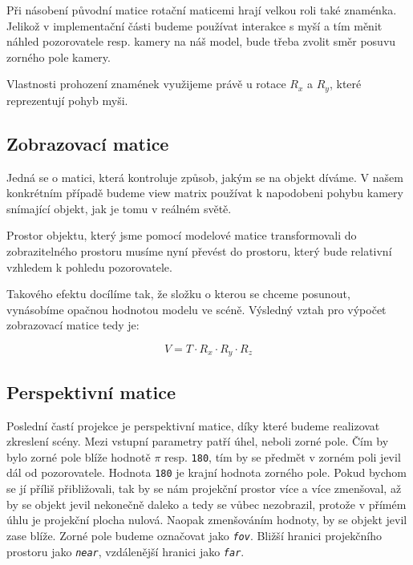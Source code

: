 Při násobení původní matice rotační maticemi hrají  velkou roli také znaménka. Jelikož v implementační části budeme používat interakce s myší a tím měnit náhled pozorovatele resp. kamery na náš model, bude třeba zvolit směr posuvu zorného pole kamery. 

Vlastnosti prohození znamének využijeme právě u  rotace $R_{x}$ a $R_{y}$, které reprezentují pohyb myši.  


\subsection{Zobrazovací matice}
Jedná se o matici, která kontroluje způsob, jakým se na objekt díváme. V našem konkrétním případě budeme view matrix používat k napodobeni pohybu kamery snímající objekt, jak je tomu v reálném světě. 

Prostor objektu, který jsme pomocí modelové matice transformovali do zobrazitelného prostoru musíme nyní převést do prostoru, který bude relativní vzhledem k pohledu pozorovatele.

Takového efektu docílíme tak, že složku o kterou se chceme posunout, vynásobíme opačnou hodnotou modelu ve scéně. Výsledný vztah pro výpočet zobrazovací matice tedy je:

$$ V = T \cdot R_{x} \cdot R_{y} \cdot R_{z} $$ 

\newpage


\subsection{Perspektivní matice}
Poslední častí projekce je perspektivní matice, díky které budeme realizovat zkreslení scény. Mezi vstupní parametry patří úhel, neboli zorné pole. Čím by bylo zorné pole blíže hodnotě $\pi$ resp. \texttt{180\degree}, tím by se předmět v zorném poli jevil dál od pozorovatele. Hodnota \texttt{180\degree} je krajní hodnota zorného pole. Pokud bychom se jí příliš přibližovali, tak by se nám projekční prostor více a více zmenšoval, až by se objekt jevil nekonečně daleko a tedy se vůbec nezobrazil, protože v přímém úhlu je projekční plocha nulová.  Naopak zmenšováním hodnoty, by se objekt jevil zase blíže. Zorné pole budeme označovat jako \texttt{\textit{fov}}. Bližší hranici projekčního prostoru jako \texttt{\textit{near}}, vzdálenější hranici jako \texttt{\textit{far}}.



